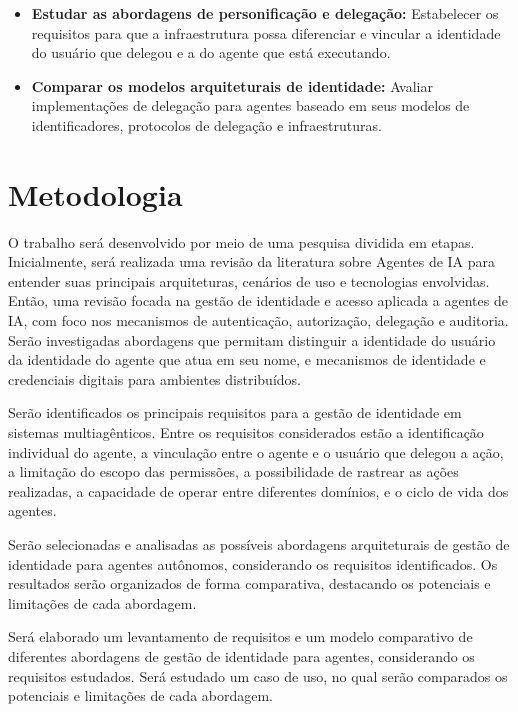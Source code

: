 \documentclass[11pt]{../../modelos-latex/classes/ifscarticle}
\begin{document}
\begin{itemize}
    \item \textbf{Estudar as abordagens de personificação e delegação:} Estabelecer os requisitos para que a infraestrutura possa diferenciar e vincular a identidade do usuário que delegou e a do agente que está executando.
    
    \item \textbf{Comparar os modelos arquiteturais de identidade:} Avaliar implementações de delegação para agentes baseado em seus modelos de identificadores, protocolos de delegação e infraestruturas.
\end{itemize}


\section{Metodologia}

O trabalho será desenvolvido por meio de uma pesquisa dividida em etapas. Inicialmente, será realizada uma revisão da literatura sobre Agentes de IA para entender suas principais arquiteturas, cenários de uso e tecnologias envolvidas. Então, uma revisão focada na gestão de identidade e acesso aplicada a agentes de IA, com foco nos mecanismos de autenticação, autorização, delegação e auditoria. Serão investigadas abordagens que permitam distinguir a identidade do usuário da identidade do agente que atua em seu nome, e mecanismos de identidade e credenciais digitais para ambientes distribuídos.

Serão identificados os principais requisitos para a gestão de identidade em sistemas multiagênticos. Entre os requisitos considerados estão a identificação individual do agente, a vinculação entre o agente e o usuário que delegou a ação, a limitação do escopo das permissões, a possibilidade de rastrear as ações realizadas, a capacidade de operar entre diferentes domínios, e o ciclo de vida dos agentes.

Serão selecionadas e analisadas as possíveis abordagens arquiteturais de gestão de identidade para agentes autônomos, considerando os requisitos identificados. Os resultados serão organizados de forma comparativa, destacando os potenciais e limitações de cada abordagem. 

Será elaborado um levantamento de requisitos e um modelo comparativo de diferentes abordagens de gestão de identidade para agentes, considerando os requisitos estudados. Será estudado um caso de uso, no qual serão comparados os potenciais e limitações de cada abordagem.
\end{document}

